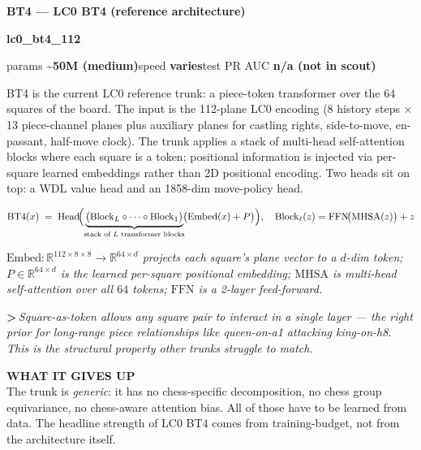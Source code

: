 \documentclass[10pt,a4paper]{article}
\newcommand{\pilllc}[0]{\colorbox{lc0bluebg}{\strut\textcolor{lc0blue}{\scriptsize\bfseries\sffamily lc0\_bt4\_112}}}
\begin{document}
\begin{tcolorbox}
\begin{tcolorbox}[archhead, boxsep=0pt, top=4pt, bottom=4pt]
\textcolor{deepforest}{\sffamily\bfseries\large BT4 --- LC0 BT4 (reference architecture)}\\[2pt]
\textcolor{muted}{\sffamily\scriptsize \pilllc{}\quad params \textbf{\textasciitilde{}50M (medium)}\quad speed \textbf{varies}\quad test PR AUC \textbf{n/a (not in scout)}}
\end{tcolorbox}
\smallskip
BT4 is the current LC0 reference trunk: a piece-token transformer over the 64 squares of the board. The input is the 112-plane LC0 encoding (8 history steps $\times$ 13 piece-channel planes plus auxiliary planes for castling rights, side-to-move, en-passant, half-move clock). The trunk applies a stack of multi-head self-attention blocks where each square is a token; positional information is injected via per-square learned embeddings rather than 2D positional encoding. Two heads sit on top: a WDL value head and an 1858-dim move-policy head.
\par\smallskip
\begin{equation*}
\mathrm{BT4}(x) \;=\; \mathrm{Head}\!\Bigl( \underbrace{ \bigl(\mathrm{Block}_L \circ \cdots \circ \mathrm{Block}_1\bigr) }_{\text{stack of $L$ transformer blocks}}\!\bigl( \mathrm{Embed}(x) + P \bigr) \Bigr), \quad \mathrm{Block}_\ell(z) = \mathrm{FFN}\!\bigl(\mathrm{MHSA}(z)\bigr) + z
\end{equation*}
\par\vspace{-4pt}\begin{center}\textit{\textcolor{muted}{\small $\mathrm{Embed}: \mathbb{R}^{112\times 8\times 8} \to \mathbb{R}^{64 \times d}$ projects each square's plane vector to a $d$-dim token; $P \in \mathbb{R}^{64\times d}$ is the learned per-square positional embedding; $\mathrm{MHSA}$ is multi-head self-attention over all $64$ tokens; $\mathrm{FFN}$ is a 2-layer feed-forward.}}\end{center}
\par\smallskip
{\color{forest}\sffamily\bfseries\textgreater\,}\textit{Square-as-token allows any square pair to interact in a single layer --- the right prior for long-range piece relationships like queen-on-a1 attacking king-on-h8. This is the structural property other trunks struggle to match.}
\par\smallskip\textbf{\sffamily\footnotesize\color{muted}WHAT IT GIVES UP}\\
The trunk is \emph{generic}: it has no chess-specific decomposition, no chess group equivariance, no chess-aware attention bias. All of those have to be learned from data. The headline strength of LC0 BT4 comes from training-budget, not from the architecture itself.
\end{tcolorbox}
\end{document}
